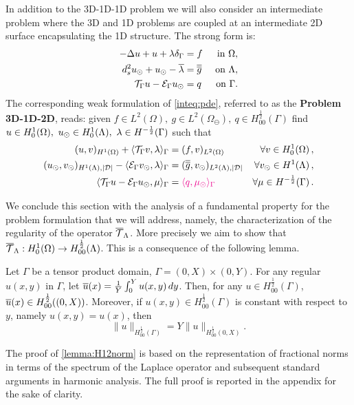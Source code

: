\documentclass[r]{siamart171218}
\newcommand{\paolo}[1]{{\color{magenta}#1}}
\begin{document}
In addition to the 3D-1D-1D problem we will also consider an 
intermediate problem where the 3D and 1D problems are coupled at an
intermediate 2D surface  encapsulating the 1D structure. The strong form is:  
\paolo{
\begin{subequations}
\label{inteq:pde}
\begin{align}
\label{inteq:pde1}
  -\Delta u + u + \lambda \delta_{\Gamma} &= f &\mbox{ in } \Omega,\\ 
\label{inteq:pde2}
 d_s^2 \ud + \ud -  \avrc{\lambda} &= \avrd{g} &\mbox{ on } \Lambda,\\
\label{inteq:coupling}
\mathcal{T}_\Gamma u - \mathcal{E}_\Gamma \ud  &=  q &\mbox{ on } \Gamma . 
\end{align}
\end{subequations}
}
The corresponding weak formulation of \eqref{inteq:pde}, referred to as the \textbf{Problem 3D-1D-2D}, reads: 
\paolo{given $f\in L^2(\Omega), \ g \in L^2(\Omega_{\ominus}), \ q \in H^\frac12_{00}(\Gamma)$}
find $u \in H^1_0(\Omega), \ u_{\odot} \in H^1_0(\Lambda), \ \lambda \in H^{-\frac 1 2}(\Gamma ) $ such that
\begin{subequations}\label{eq:problem1}
\begin{align}
(u,v)_{H^1(\Omega)} + \langle \trace v, \lambda \rangle_\Gamma &= (f,v)_{L^2(\Omega)} &\forall v \in H^1_0(\Omega)\, ,
\\
 (\ud,\vd)_{H^1(\Lambda),|\D|}  -  \langle \ext \vd, \lambda \rangle_\Gamma
&=  (\avrd{g},\vd)_{L^2(\Lambda),|\D|} &\forall\vd \in H^1(\Lambda)\, ,
\\
\langle \trace u - \ext \ud , \mu \rangle_\Gamma 
&= \paolo{\langle q,\md\rangle_\Gamma} 
&\forall \mu \in H^{-\frac 1 2}(\Gamma)\,.
\end{align}
\end{subequations}

We conclude this section with the analysis of a fundamental property for the problem formulation that we will address, namely, the characterization of the regularity of the operator ${\overline{\mathcal{T}}_\Lambda}$. More precisely we aim to show that ${\overline{\mathcal{T}}_\Lambda}: H^1_0(\Omega) \rightarrow H^\frac 1 2_{00}(\Lambda)$.
This is a consequence of the following lemma.

\begin{lemma}\label{lemma:H12norm}
Let $\Gamma$ be a tensor product domain, $\Gamma= (0,X) \times (0,Y)$. For any regular $u(x,y)$ in $\Gamma$, let $\overline{u}(x)=\frac 1Y \int _0^Y u(x,y)\, dy$. Then, for any $u\in H_{00}^{\frac 12}(\Gamma)$, $\overline{u}(x)\in H_{00}^{\frac 12}((0,X))$. 
Moreover, if $u(x,y)\in H^{\frac 12}_{00}(\Gamma)$ is constant with respect to $y$, namely $u(x,y)=u(x)$, then 
\begin{equation*}
\|u\|_{H^{\frac 12}_{00}(\Gamma)}=Y \|u\|_{H^{\frac 12}_{00}(0,X)}.
\end{equation*}
\end{lemma}
The proof of \ref{lemma:H12norm} is based on the representation of fractional norms in terms of the spectrum of the Laplace operator and subsequent standard arguments in harmonic analysis. The full proof is reported in the appendix for the sake of clarity.
\end{document}
